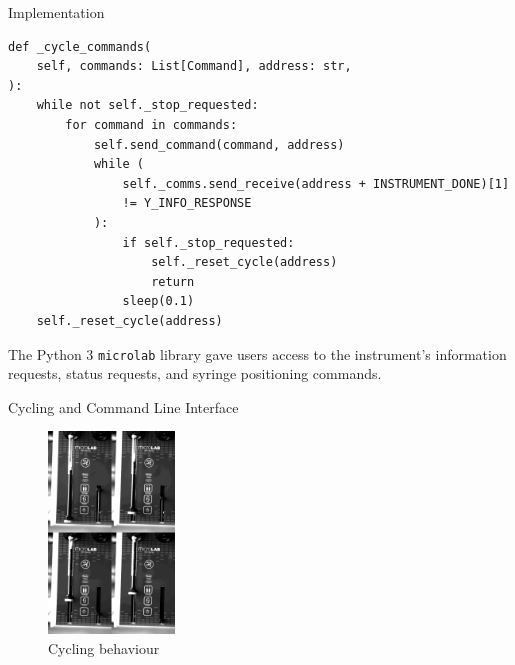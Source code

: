\documentclass[a0paper,landscape,fontscale=0.32]{baposter}
\begin{document}
\begin{poster}
\begin{posterbox}[name=implementation,column=1,span=2]{Implementation}
\begin{verbatim}
def _cycle_commands(
    self, commands: List[Command], address: str,
):
    while not self._stop_requested:
        for command in commands:
            self.send_command(command, address)
            while (
                self._comms.send_receive(address + INSTRUMENT_DONE)[1]
                != Y_INFO_RESPONSE
            ):
                if self._stop_requested:
                    self._reset_cycle(address)
                    return
                sleep(0.1)
    self._reset_cycle(address)
\end{verbatim}
    The Python 3 \texttt{microlab} library gave users access to the instrument's information requests, status requests, and syringe positioning commands.
\end{posterbox}
\begin{posterbox}[name=cycling,column=1,span=2,below=implementation]{Cycling and Command Line Interface}
\begin{multicols}{2}
\begin{figure}[H]
    \begin{center}
    \includegraphics[width=0.3\textwidth]{images/combined}
    \end{center}
    \vspace{-1.2em}
  \caption{Cycling behaviour}
\end{figure}
\end{multicols}
\end{posterbox}


\end{poster}
\end{document}
